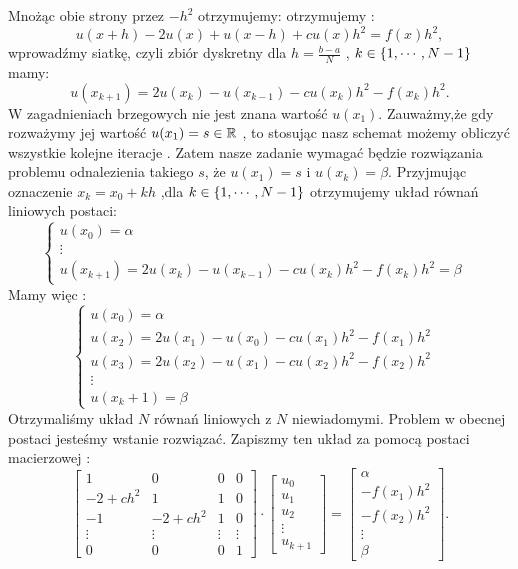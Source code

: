 \documentclass[12pt,a4paper]{report}
\begin{document}
Mnożąc obie strony przez $-h^2$ otrzymujemy:  otrzymujemy :
\begin{equation}
u(x+h) - 2u(x) + u(x-h) + cu(x)h^2 = f(x)h^2,
\end{equation}
wprowadźmy siatkę, czyli zbiór dyskretny dla $ h= \frac{b-a}{N}$ , $k \in \left\lbrace {1,\cdots,N-1} \right\rbrace$  mamy: 
\begin{equation} \label{boundary_model}
u(x_{k+1}) = 2u(x_k) - u(x_{k-1}) - cu(x_k)h^2 - f(x_k)h^2.
\end{equation}
W zagadnieniach brzegowych nie jest znana wartość $u(x_1)$. Zauważmy,że gdy rozważymy jej wartość $u(x_1) = s \in \mathbb{R}$ , to stosując nasz schemat możemy obliczyć wszystkie kolejne iteracje . Zatem nasze zadanie wymagać będzie rozwiązania problemu odnalezienia takiego $s$, że $u(x_1) = s$ i $u(x_k) = \beta$. Przyjmując oznaczenie $ x_k = x_0 + kh$ ,dla $ k \in \left\lbrace {1, \cdots,N-1} \right\rbrace $ otrzymujemy układ równań liniowych postaci:
\begin{equation}
\left\{ \begin{array}{ll}
u(x_0) = \alpha & \\
\vdots  & \\
u(x_{k+1}) = 2u(x_k) - u(x_{k-1}) - cu(x_k)h^2 - f(x_k)h^2 = \beta & 
\end{array} \right.
\end{equation}
Mamy więc  :
\begin{equation}
\left\{ \begin{array}{ll}
u(x_0) = \alpha & \\
u(x_2) = 2u(x_1) - u(x_{0}) - cu(x_1)h^2 - f(x_1)h^2 & \\ 
u(x_3) = 2u(x_2) - u(x_{1}) - cu(x_2)h^2 - f(x_2)h^2 & \\
\vdots & \\
u(x_k+1) = \beta  
\end{array} \right.
\end{equation}
Otrzymaliśmy układ $N$ równań liniowych z $N$ niewiadomymi. Problem w obecnej postaci jesteśmy wstanie rozwiązać. Zapiszmy ten układ za pomocą postaci macierzowej :
$$ 
\left[ \begin{array}{cccc}
1 & 0 & 0 & 0 \\
-2+ch^2 & 1 & 1 & 0 \\
-1 & -2+ch^2 & 1 & 0 \\
\vdots & \vdots & \vdots & \vdots \\
0 & 0 & 0 & 1 
\end{array} \right] \cdot
\left[ \begin{array}{c}
u_0 \\
u_1 \\
u_2 \\
\vdots \\
u_{k+1}  
\end{array} \right] =
\left[ \begin{array}{c}
\alpha \\
-f(x_1)h^2 \\
-f(x_2)h^2\\
\vdots \\
\beta   
\end{array} \right] .
$$
\end{document}
